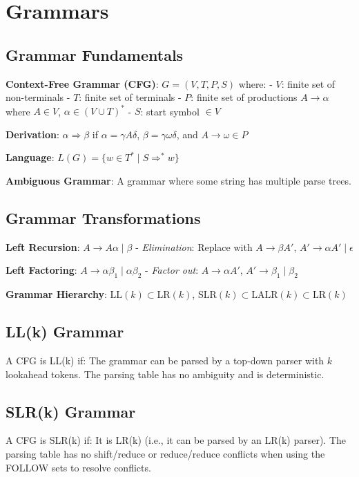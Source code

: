 
\section{Grammars}

\subsection{Grammar Fundamentals}
\textbf{Context-Free Grammar (CFG)}: $G = (V, T, P, S)$ where:
- $V$: finite set of non-terminals
- $T$: finite set of terminals  
- $P$: finite set of productions $A \to \alpha$ where $A \in V$, $\alpha \in (V \cup T)^*$
- $S$: start symbol $\in V$

\textbf{Derivation}: $\alpha \Rightarrow \beta$ if $\alpha = \gamma A \delta$, $\beta = \gamma \omega \delta$, and $A \to \omega \in P$

\textbf{Language}: $L(G) = \{w \in T^* \mid S \Rightarrow^* w\}$

\textbf{Ambiguous Grammar}: A grammar where some string has multiple parse trees.

\subsection{Grammar Transformations}
\textbf{Left Recursion}: $A \to A\alpha \mid \beta$
- \textit{Elimination}: Replace with $A \to \beta A'$, $A' \to \alpha A' \mid \epsilon$

\textbf{Left Factoring}: $A \to \alpha\beta_1 \mid \alpha\beta_2$
- \textit{Factor out}: $A \to \alpha A'$, $A' \to \beta_1 \mid \beta_2$

\textbf{Grammar Hierarchy}: $\text{LL}(k) \subset \text{LR}(k)$, $\text{SLR}(k) \subset \text{LALR}(k) \subset \text{LR}(k)$

\subsection{LL(k) Grammar}
A CFG is LL(k) if:
The grammar can be parsed by a top-down parser with $k$ lookahead tokens.
The parsing table has no ambiguity and is deterministic.

\subsection{SLR(k) Grammar}
A CFG is SLR(k) if:
It is LR(k) (i.e., it can be parsed by an LR(k) parser).
The parsing table has no shift/reduce or reduce/reduce conflicts when using the FOLLOW sets to resolve conflicts.


